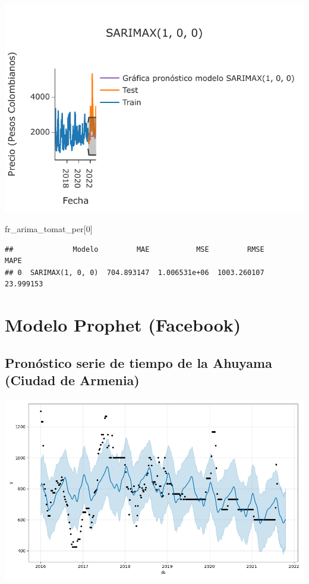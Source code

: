 \documentclass[
]{book}
\newenvironment{Shaded}{\begin{snugshade}}{\end{snugshade}}
\newcommand{\DecValTok}[1]{\textcolor[rgb]{0.00,0.00,0.81}{#1}}
\newcommand{\NormalTok}[1]{#1}
\begin{document}
\includegraphics{bookdown-demo_files/figure-latex/unnamed-chunk-170-167.pdf}

\begin{Shaded}
\begin{Highlighting}[]

\NormalTok{fr\_arima\_tomat\_per[}\DecValTok{0}\NormalTok{]}
\end{Highlighting}
\end{Shaded}

\begin{verbatim}
##              Modelo         MAE           MSE         RMSE       MAPE
## 0  SARIMAX(1, 0, 0)  704.893147  1.006531e+06  1003.260107  23.999153
\end{verbatim}

\hypertarget{modelo-prophet-facebook}{%
\section{Modelo Prophet (Facebook)}\label{modelo-prophet-facebook}}

\hypertarget{pronuxf3stico-serie-de-tiempo-de-la-ahuyama-ciudad-de-armenia-2}{%
\subsection{Pronóstico serie de tiempo de la Ahuyama (Ciudad de Armenia)}\label{pronuxf3stico-serie-de-tiempo-de-la-ahuyama-ciudad-de-armenia-2}}

\includegraphics{Prophet_Ahuyama_AXM.png}
\end{document}
